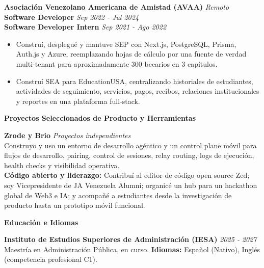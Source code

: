 \documentclass[10pt]{article}
\newcommand{\sectiontitle}[1]{%
    \vspace{4pt}
    \begin{center}
        \textbf{#1}
    \end{center}
    \vspace{-5pt}
}
\begin{document}
\vspace{2pt}
\textbf{Asociación Venezolano Americana de Amistad (AVAA)} \hfill \textit{Remoto} \\
\textbf{Software Developer} \hfill \textit{Sep 2022 - Jul 2024} \\
\textbf{Software Developer Intern} \hfill \textit{Sep 2021 - Ago 2022}
\begin{itemize}
    \item Construí, desplegué y mantuve SEP con Next.js, PostgreSQL, Prisma, Auth.js y Azure, reemplazando hojas de cálculo por una fuente de verdad multi-tenant para aproximadamente 300 becarios en 3 capítulos.
    \item Construí SEA para EducationUSA, centralizando historiales de estudiantes, actividades de seguimiento, servicios, pagos, recibos, relaciones institucionales y reportes en una plataforma full-stack.
\end{itemize}

\sectiontitle{Proyectos Seleccionados de Producto y Herramientas}
\textbf{Zrode y Brio} \hfill \textit{Proyectos independientes} \\
Construyo y uso un entorno de desarrollo agéntico y un control plane móvil para flujos de desarrollo, pairing, control de sesiones, relay routing, logs de ejecución, health checks y visibilidad operativa. \\
\textbf{Código abierto y liderazgo:} Contribuí al editor de código open source Zed; soy Vicepresidente de JA Venezuela Alumni; organicé un hub para un hackathon global de Web3 e IA; y acompañé a estudiantes desde la investigación de producto hasta un prototipo móvil funcional.

\sectiontitle{Educación e Idiomas}
\textbf{Instituto de Estudios Superiores de Administración (IESA)} \hfill \textit{2025 - 2027} \\
Maestría en Administración Pública, en curso. \textbf{Idiomas:} Español (Nativo), Inglés (competencia profesional C1).
\end{document}
